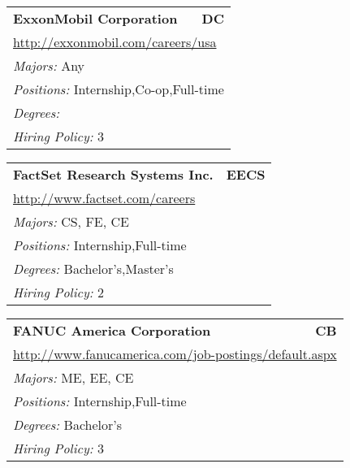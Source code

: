 \documentclass[twoside]{article}
\begin{document}
\begin{center}
\begin{multicols}{3}
\begin{FlushLeft}
\begin{minipage}{.9\columnwidth}
\end{minipage}
 
\begin{minipage}{.9\columnwidth}\begin{tabularx}{.95\columnwidth}{Xr}
                 {\Large\bf ExxonMobil Corporation} & {\Large\bf DC}\\
    \multicolumn{2}{p{.95\columnwidth}}{\url{http://exxonmobil.com/careers/usa}}\\
    \multicolumn{2}{p{.95\columnwidth}}{\emph{Majors:} Any}\\
    \multicolumn{2}{p{.95\columnwidth}}{\emph{Positions:} Internship,Co-op,Full-time}\\
    \multicolumn{2}{p{.95\columnwidth}}{\emph{Degrees:} }\\
    \multicolumn{2}{p{.95\columnwidth}}{\emph{Hiring Policy:} 3}\\
    \end{tabularx}
    
\end{minipage}
 
\begin{minipage}{.9\columnwidth}\begin{tabularx}{.95\columnwidth}{Xr}
                 {\Large\bf FactSet Research Systems Inc.} & {\Large\bf EECS}\\
    \multicolumn{2}{p{.95\columnwidth}}{\url{http://www.factset.com/careers}}\\
    \multicolumn{2}{p{.95\columnwidth}}{\emph{Majors:} CS, FE, CE}\\
    \multicolumn{2}{p{.95\columnwidth}}{\emph{Positions:} Internship,Full-time}\\
    \multicolumn{2}{p{.95\columnwidth}}{\emph{Degrees:} Bachelor's,Master's}\\
    \multicolumn{2}{p{.95\columnwidth}}{\emph{Hiring Policy:} 2}\\
    \end{tabularx}
    
\end{minipage}
 
\begin{minipage}{.9\columnwidth}\begin{tabularx}{.95\columnwidth}{Xr}
                 {\Large\bf FANUC America Corporation} & {\Large\bf CB}\\
    \multicolumn{2}{p{.95\columnwidth}}{\url{http://www.fanucamerica.com/job-postings/default.aspx}}\\
    \multicolumn{2}{p{.95\columnwidth}}{\emph{Majors:} ME, EE, CE}\\
    \multicolumn{2}{p{.95\columnwidth}}{\emph{Positions:} Internship,Full-time}\\
    \multicolumn{2}{p{.95\columnwidth}}{\emph{Degrees:} Bachelor's}\\
    \multicolumn{2}{p{.95\columnwidth}}{\emph{Hiring Policy:} 3}\\
    \end{tabularx}
    

\end{minipage}
\end{FlushLeft}
\end{multicols}
\end{center}
\end{document}

